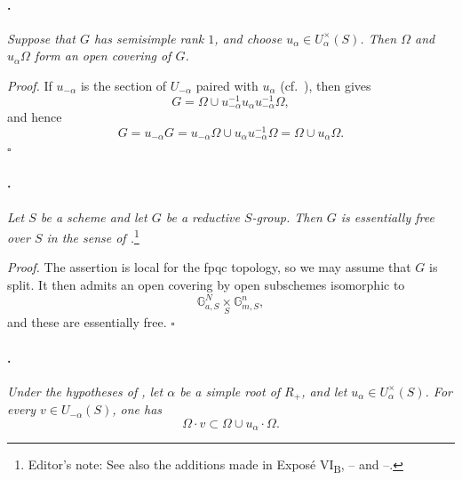 \paragraph{.}
\textit{Suppose that \(G\) has semisimple rank \(1\), and choose
\(u_\alpha\in U_\alpha^\times(S)\). Then \(\Omega\) and
\(u_\alpha\Omega\) form an open covering of \(G\).}

\textit{Proof.}
If \(u_{-\alpha}\) is the section of \(U_{-\alpha}\) paired with
\(u_\alpha\) \textup{(cf.\ )}, then  \textup{} gives
\[
  G
  =
  \Omega\cup
  u_{-\alpha}^{-1}u_\alpha u_{-\alpha}^{-1}\Omega,
\]
and hence
\[
  G
  =
  u_{-\alpha}G
  =
  u_{-\alpha}\Omega\cup
  u_\alpha u_{-\alpha}^{-1}\Omega
  =
  \Omega\cup u_\alpha\Omega.
\]
\hfill\(\square\)

\paragraph{.}
\textit{Let \(S\) be a scheme and let \(G\) be a reductive
\(S\)-group. Then \(G\) is essentially free over \(S\) in the sense
of .}\footnote{Editor's note: See also the additions
made in Exposé VI\textsubscript{B}, -- and
--.}

\textit{Proof.}
The assertion is local for the fpqc topology, so we may assume that
\(G\) is split. It then admits an open covering by open subschemes
isomorphic to
\[
  \mathbb G_{a,S}^{N}\mathop{\times}\limits_S\mathbb G_{m,S}^{n},
\]
and these are essentially free.
\hfill\(\square\)

\paragraph{.}
\textit{Under the hypotheses of , let \(\alpha\) be a simple
root of \(R_+\), and let \(u_\alpha\in U_\alpha^\times(S)\). For
every \(v\in U_{-\alpha}(S)\), one has}
\[
  \Omega\cdot v\subset\Omega\cup u_\alpha\cdot\Omega.
\]


